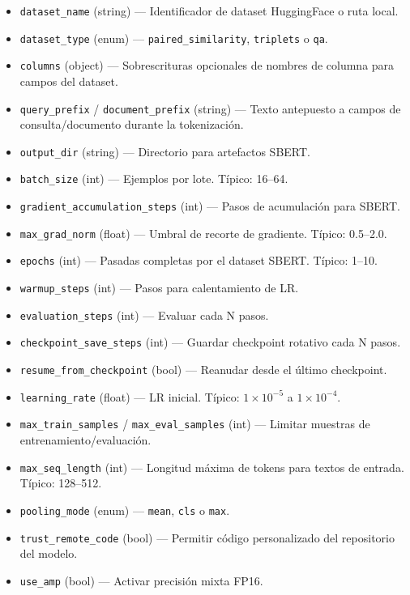 \begin{itemize}[nosep]
    \item \texttt{dataset\_name} (string) --- Identificador de dataset HuggingFace o ruta local.
    \item \texttt{dataset\_type} (enum) --- \texttt{paired\_similarity}, \texttt{triplets} o \texttt{qa}.
    \item \texttt{columns} (object) --- Sobrescrituras opcionales de nombres de columna para campos del dataset.
    \item \texttt{query\_prefix} / \texttt{document\_prefix} (string) --- Texto antepuesto a campos de consulta/documento durante la tokenización.
    \item \texttt{output\_dir} (string) --- Directorio para artefactos SBERT.
    \item \texttt{batch\_size} (int) --- Ejemplos por lote. Típico: 16--64.
    \item \texttt{gradient\_accumulation\_steps} (int) --- Pasos de acumulación para SBERT.
    \item \texttt{max\_grad\_norm} (float) --- Umbral de recorte de gradiente. Típico: 0.5--2.0.
    \item \texttt{epochs} (int) --- Pasadas completas por el dataset SBERT. Típico: 1--10.
    \item \texttt{warmup\_steps} (int) --- Pasos para calentamiento de LR.
    \item \texttt{evaluation\_steps} (int) --- Evaluar cada N pasos.
    \item \texttt{checkpoint\_save\_steps} (int) --- Guardar checkpoint rotativo cada N pasos.
    \item \texttt{resume\_from\_checkpoint} (bool) --- Reanudar desde el último checkpoint.
    \item \texttt{learning\_rate} (float) --- LR inicial. Típico: $1\times10^{-5}$ a $1\times10^{-4}$.
    \item \texttt{max\_train\_samples} / \texttt{max\_eval\_samples} (int) --- Limitar muestras de entrenamiento/evaluación.
    \item \texttt{max\_seq\_length} (int) --- Longitud máxima de tokens para textos de entrada. Típico: 128--512.
    \item \texttt{pooling\_mode} (enum) --- \texttt{mean}, \texttt{cls} o \texttt{max}.
    \item \texttt{trust\_remote\_code} (bool) --- Permitir código personalizado del repositorio del modelo.
    \item \texttt{use\_amp} (bool) --- Activar precisión mixta FP16.

\end{itemize}
